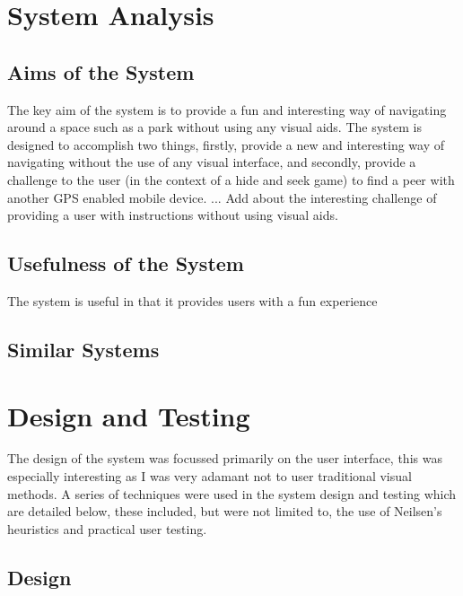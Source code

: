 \documentclass[12pt]{article} %
\begin{document}

\tableofcontents %

\newpage

\section{System Analysis}



\subsection{Aims of the System}
\label{Aims}
The key aim of the system is to provide a fun and interesting way of navigating around a space such
as a park without using any visual aids. The system is designed to accomplish two things, firstly,
provide a new and interesting way of navigating without the use of any visual interface, and
secondly, provide a challenge to the user (in the context of a hide and seek game) to find a peer
with another GPS enabled mobile device. ... Add about the interesting challenge of providing a user
with instructions without using visual aids.


\subsection{Usefulness of the System} 
The system is useful in that it provides users with a fun experience 

\subsection{Similar Systems} 
\newpage
\section{Design and Testing}
The design of the system was focussed primarily on the user interface, this was especially
interesting as I was very adamant not to user traditional visual methods. A series of techniques
were used in the system design and testing which are detailed below, these included, but were not
limited to, the use of Neilsen's heuristics and practical user testing.

\subsection{Design}
\end{document}

